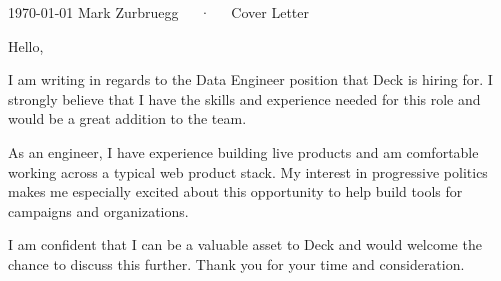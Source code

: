 \documentclass[11pt, a4paper]{awesome-cv}
\begin{document}
\makecvheader[R]

\makecvfooter
  {\today}
  {Mark Zurbruegg~~~·~~~Cover Letter}
  {}

\makelettertitle

\begin{cvletter}



Hello,

I am writing in regards to the Data Engineer position that Deck is hiring for. I strongly believe that I have the skills and experience needed for this role and would be a great addition to the team.

As an engineer, I have experience building live products and am comfortable working across a typical web product stack. My interest in progressive politics makes me especially excited about this opportunity to help build tools for campaigns and organizations.

I am confident that I can be a valuable asset to Deck and would welcome the chance to discuss this further. Thank you for your time and consideration.
\end{cvletter}


\makeletterclosing
\end{document}
